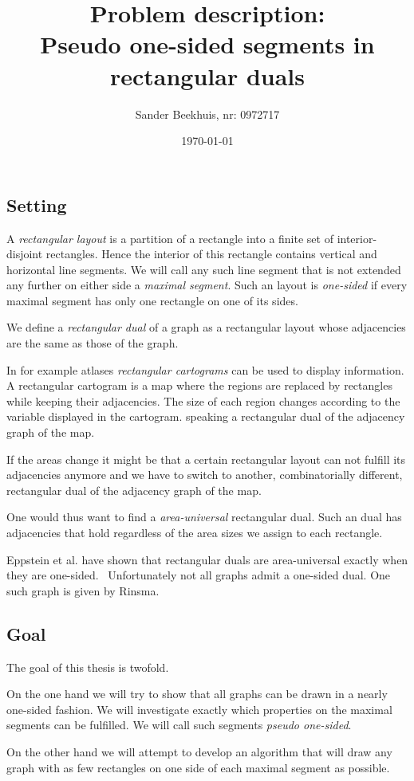 \documentclass[a4paper]{article}
\title{Problem description:\\ Pseudo one-sided segments in rectangular duals}
\author{Sander Beekhuis, nr: 0972717}
\date{\today} %
\begin{document}
\maketitle

\subsection*{Setting}
A  \emph{rectangular layout} is a partition of a rectangle into a finite set of interior-disjoint rectangles. Hence the interior of this rectangle contains vertical and horizontal line segments. We will call any such line segment that is not extended any further on either side a \emph{maximal segment}. Such an layout is \emph{one-sided} if every maximal segment has only one rectangle on one of its sides.

We define a \emph{rectangular dual} of a graph as a rectangular layout whose adjacencies are the same as those of the graph.

In for example atlases \emph{rectangular cartograms} can be used to display information. A rectangular cartogram is a map where the regions are replaced by rectangles while keeping their adjacencies. The size of each region changes according to the variable displayed in the cartogram.   speaking a rectangular dual of the adjacency graph of the map.

If the areas change it might be that a certain rectangular layout can not fulfill its adjacencies anymore and we have to switch to another, combinatorially different, rectangular dual of the adjacency graph of the map.

One would thus want to find a \emph{area-universal} rectangular dual. Such an dual has adjacencies that hold regardless of the area sizes we assign to  each rectangle.


Eppstein et al. have shown that rectangular duals are area-universal exactly when they are one-sided.~\cite{Eppstein2012} Unfortunately not all graphs admit a one-sided dual. One such graph is given by Rinsma.~\cite{Rinsma1987}

\subsection*{Goal}
The goal of this thesis is twofold.

On the one hand we will try to show that all graphs can be drawn in a nearly one-sided fashion. We will investigate exactly which properties on the {maximal segments} can be fulfilled. We will call such segments \emph{pseudo one-sided}.

On the other hand we will attempt to develop an algorithm that will draw any graph with as few rectangles on one side of each {maximal segment} as possible.

\printbibliography
\end{document}
